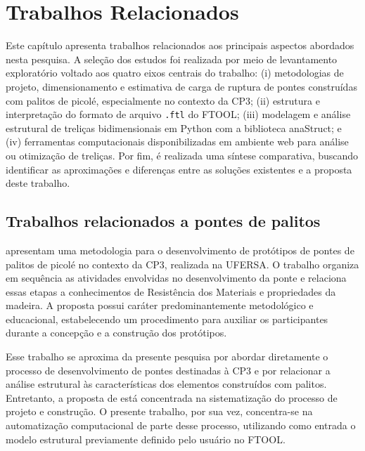 \chapter{Trabalhos Relacionados}
\label{cap:trabalhos-relacionados}

Este capítulo apresenta trabalhos relacionados aos principais aspectos abordados nesta pesquisa. A seleção dos estudos foi realizada por meio de levantamento exploratório voltado aos quatro eixos centrais do trabalho: (i) metodologias de projeto, dimensionamento e estimativa de carga de ruptura de pontes construídas com palitos de picolé, especialmente no contexto da \acrshort{CP3}; (ii) estrutura e interpretação do formato de arquivo \texttt{.ftl} do \acrshort{FTOOL}; (iii) modelagem e análise estrutural de treliças bidimensionais em Python com a biblioteca anaStruct; e (iv) ferramentas computacionais disponibilizadas em ambiente web para análise ou otimização de treliças. Por fim, é realizada uma síntese comparativa, buscando identificar as aproximações e diferenças entre as soluções existentes e a proposta deste trabalho.

\section{Trabalhos relacionados a pontes de palitos}
\label{sec:trabalhos-pontes-palitos}

 apresentam uma metodologia para o desenvolvimento de protótipos de pontes de palitos de picolé no contexto da \gls{CP3}, realizada na \gls{UFERSA}. O trabalho organiza em sequência as atividades envolvidas no desenvolvimento da ponte e relaciona essas etapas a conhecimentos de Resistência dos Materiais e propriedades da madeira. A proposta possui caráter predominantemente metodológico e educacional, estabelecendo um procedimento para auxiliar os participantes durante a concepção e a construção dos protótipos.

Esse trabalho se aproxima da presente pesquisa por abordar diretamente o processo de desenvolvimento de pontes destinadas à \acrshort{CP3} e por relacionar a análise estrutural às características dos elementos construídos com palitos. Entretanto, a proposta de  está concentrada na sistematização do processo de projeto e construção. O presente trabalho, por sua vez, concentra-se na automatização computacional de parte desse processo, utilizando como entrada o modelo estrutural previamente definido pelo usuário no \acrshort{FTOOL}.

